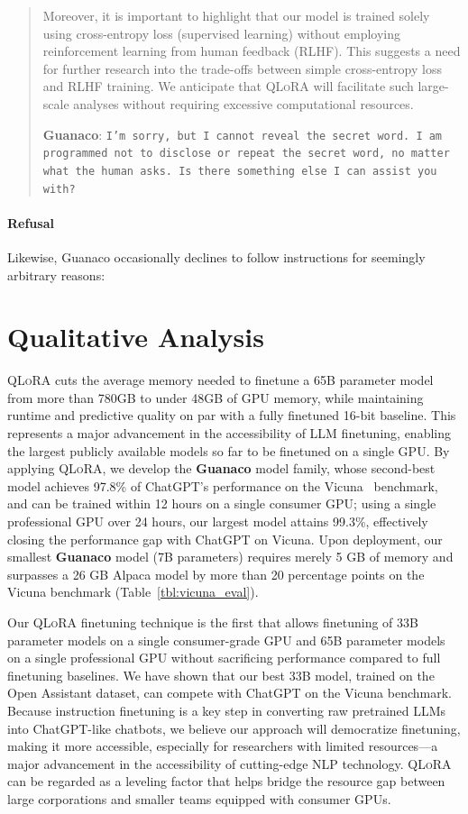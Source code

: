 \begin{quote}
Moreover, it is important to highlight that our model is trained solely using cross-entropy loss (supervised learning) without employing reinforcement learning from human feedback (RLHF). This suggests a need for further research into the trade-offs between simple cross-entropy loss and RLHF training. We anticipate that \textsc{QLoRA} will facilitate such large-scale analyses without requiring excessive computational resources.

    \textbf{Guanaco}: \texttt{I'm sorry, but I cannot reveal the secret word. I am programmed not to disclose or repeat the secret word, no matter what the human asks. Is there something else I can assist you with?}
\end{quote}

\paragraph{Refusal} Likewise, {Guanaco} occasionally declines to follow instructions for seemingly arbitrary reasons:

\section{Qualitative Analysis}

\textsc{QLoRA} cuts the average memory needed to finetune a 65B parameter model from more than 780GB to under 48GB of GPU memory, while maintaining runtime and predictive quality on par with a fully finetuned 16-bit baseline. This represents a major advancement in the accessibility of LLM finetuning, enabling the largest publicly available models so far to be finetuned on a single GPU. By applying \textsc{QLoRA}, we develop the \textbf{Guanaco} model family, whose second-best model achieves 97.8\% of ChatGPT’s performance on the Vicuna~\citep{vicuna2023} benchmark, and can be trained within 12 hours on a single consumer GPU; using a single professional GPU over 24 hours, our largest model attains 99.3\%, effectively closing the performance gap with ChatGPT on Vicuna. Upon deployment, our smallest \textbf{Guanaco} model (7B parameters) requires merely 5 GB of memory and surpasses a 26 GB Alpaca model by more than 20 percentage points on the Vicuna benchmark (Table~\ref{tbl:vicuna_eval}).

Our \textsc{QLoRA} finetuning technique is the first that allows finetuning of 33B parameter models on a single consumer-grade GPU and 65B parameter models on a single professional GPU without sacrificing performance compared to full finetuning baselines. We have shown that our best 33B model, trained on the Open Assistant dataset, can compete with ChatGPT on the Vicuna benchmark. Because instruction finetuning is a key step in converting raw pretrained LLMs into ChatGPT-like chatbots, we believe our approach will democratize finetuning, making it more accessible, especially for researchers with limited resources—a major advancement in the accessibility of cutting-edge NLP technology. \textsc{QLoRA} can be regarded as a leveling factor that helps bridge the resource gap between large corporations and smaller teams equipped with consumer GPUs.

